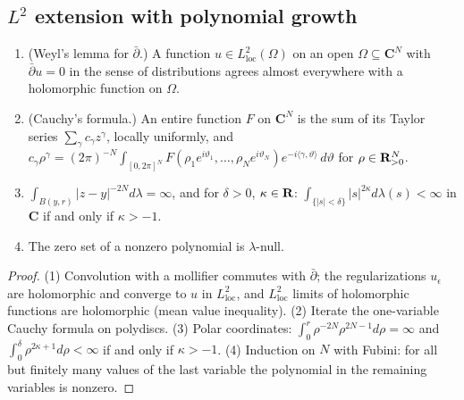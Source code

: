 \subsection{\texorpdfstring{$L^2$}{L2} extension with polynomial growth}

\begin{lemma}\label{lem:c0-analytic-basics}
\leanok
\begin{enumerate}
\item (Weyl's lemma for $\bar\partial$.) A function $u\in L^2_{\mathrm{loc}}(\Omega)$ on an open $\Omega\subseteq\mathbf C^N$ with $\bar\partial u=0$ in the sense of
distributions agrees almost everywhere with a holomorphic function on $\Omega$.
\item (Cauchy's formula.) An entire function $F$ on $\mathbf C^N$ is the sum of its Taylor series $\sum_\gamma c_\gamma z^\gamma$, locally
uniformly, and $c_\gamma\rho^\gamma=(2\pi)^{-N}\int_{[0,2\pi]^N}F(\rho_1e^{i\vartheta_1},\dots,\rho_Ne^{i\vartheta_N})e^{-i\langle\gamma,\vartheta\rangle}\,d\vartheta$ for
$\rho\in\mathbf{R}_{>0}^N$.
\item $\int_{B(y,r)}|z-y|^{-2N}d\lambda=\infty$, and for $\delta>0$, $\kappa\in\mathbf{R}$: $\int_{\{|s|<\delta\}}|s|^{2\kappa}d\lambda(s)<\infty$ in $\mathbf C$ if and only if
$\kappa>-1$.
\item The zero set of a nonzero polynomial is $\lambda$-null.
\end{enumerate}
\end{lemma}

\begin{proof}
(1) Convolution with a mollifier commutes with $\bar\partial$; the regularizations $u_\epsilon$ are holomorphic and converge to $u$ in
$L^2_{\mathrm{loc}}$, and $L^2_{\mathrm{loc}}$ limits of holomorphic functions are holomorphic (mean value inequality). (2) Iterate the
one-variable Cauchy formula on polydiscs. (3) Polar coordinates: $\int_0^r\rho^{-2N}\rho^{2N-1}d\rho=\infty$ and
$\int_0^\delta\rho^{2\kappa+1}d\rho<\infty$ if and only if $\kappa>-1$. (4) Induction on $N$ with Fubini: for all but finitely many values of the
last variable the polynomial in the remaining variables is nonzero.
\end{proof}

